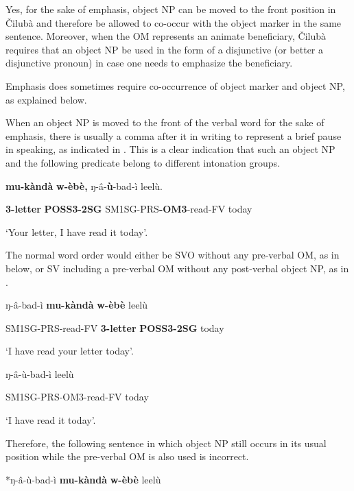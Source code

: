 \documentclass[output=paper]{langscibook}
\begin{document}
Yes, for the sake of emphasis, object NP can be moved to the front position in Čilubà and therefore be allowed to co-occur with the object marker in the same sentence. Moreover, when the OM represents an animate beneficiary, Čilubà requires that an object NP be used in the form of a disjunctive (or better a disjunctive pronoun) in case one needs to emphasize the beneficiary.

Emphasis does sometimes require co-occurrence of object marker and object NP, as explained below.

When an object NP is moved to the front of the verbal word for the sake of emphasis, there is usually a comma after it in writing to represent a brief pause in speaking, as indicated in . This is a clear indication that such an object NP and the following predicate belong to different intonation groups.

\ea%
    \label{ex:lukusa:4}
    \z

            \textbf{mu-kàndà}    \textbf{w-èbè,}      ŋ-â-\textbf{ù}{}-bad-ì              leelù.

\textbf{3-letter}      \textbf{POSS3-2SG}    SM1SG-PRS\textbf{{}-OM3}{}-read-FV     today

\glt ‘Your letter, I have read it today’.

The normal word order would either be SVO without any pre-verbal OM, as in  below, or SV including a pre-verbal OM without any post-verbal object NP, as in .

\ea%
    \label{ex:lukusa:5}
    \z

            ŋ-â-bad-ì           \textbf{mu-kàndà}    \textbf{w-èbè}       leelù

    SM1SG-PRS-read-FV    \textbf{3-letter}      \textbf{POSS3-2SG}     today

\glt ‘I have read your letter today’.

\ea%
    \label{ex:lukusa:6}
    \z

            ŋ-â-ù-bad-ì             leelù

    SM1SG-PRS-OM3-read-FV    today

\glt ‘I have read it today’.

Therefore, the following sentence in which object NP still occurs in its usual position while the pre-verbal OM is also used is incorrect.

\ea%
    \label{ex:lukusa:7}
    \z

            *ŋ-â-ù-bad-ì             \textbf{mu-kàndà}    \textbf{w-èbè}       leelù
\end{document}
